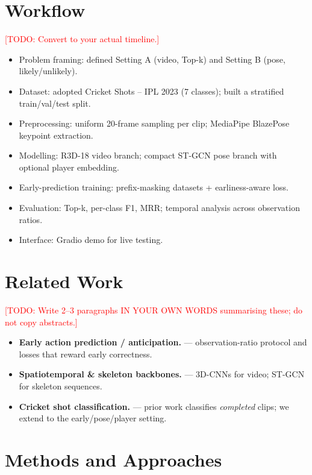 \documentclass[11pt]{article}
\newcommand{\TODO}[1]{\textcolor{red}{[TODO: #1]}}
\begin{document}
\section{Workflow}
\TODO{Convert to your actual timeline.}
\begin{itemize}[nosep]
  \item Problem framing: defined Setting A (video, Top-k) and Setting B (pose, likely/unlikely).
  \item Dataset: adopted Cricket Shots -- IPL 2023 (7 classes); built a stratified train/val/test split.
  \item Preprocessing: uniform 20-frame sampling per clip; MediaPipe BlazePose keypoint extraction.
  \item Modelling: R3D-18 video branch; compact ST-GCN pose branch with optional player embedding.
  \item Early-prediction training: prefix-masking datasets + earliness-aware loss.
  \item Evaluation: Top-k, per-class F1, MRR; temporal analysis across observation ratios.
  \item Interface: Gradio demo for live testing.
\end{itemize}

\section{Related Work}
\TODO{Write 2--3 paragraphs IN YOUR OWN WORDS summarising these; do not copy abstracts.}
\begin{itemize}[nosep]
  \item \textbf{Early action prediction / anticipation.} \cite{kong2018survey,aliakbarian2017}
        --- observation-ratio protocol and losses that reward early correctness.
  \item \textbf{Spatiotemporal \& skeleton backbones.} \cite{feichtenhofer2019slowfast,yan2018stgcn}
        --- 3D-CNNs for video; ST-GCN for skeleton sequences.
  \item \textbf{Cricket shot classification.} \cite{rajarajeswari2026,sen2021cricshot}
        --- prior work classifies \emph{completed} clips; we extend to the early/pose/player setting.
\end{itemize}

\section{Methods and Approaches}
\end{document}

